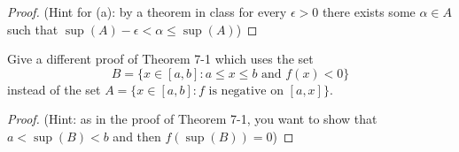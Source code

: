 \documentclass{article} %
\theoremstyle{plain}
\theoremstyle{definition}
\begin{document}
\begin{proof} (Hint for (a): by a theorem in class for every $\epsilon > 0$ there exists some $\alpha \in A$ such that $\sup(A) -\epsilon < \alpha \leq \sup(A)$)
	
\end{proof} 





\noindent{} Give a different proof of Theorem 7-1 which uses the set 
$$B = \{x \in [a,b] : a \leq x \leq b \text{ and } f(x) < 0\}$$
instead of the set $A = \{ x \in [a,b] : f \text{ is negative on } [a,x]\}$. 

\begin{proof} (Hint: as in the proof of Theorem 7-1, you want to show that $a < \sup(B) < b$ and then $f(\sup(B)) = 0$)
	
\end{proof} 


    
\end{document}
